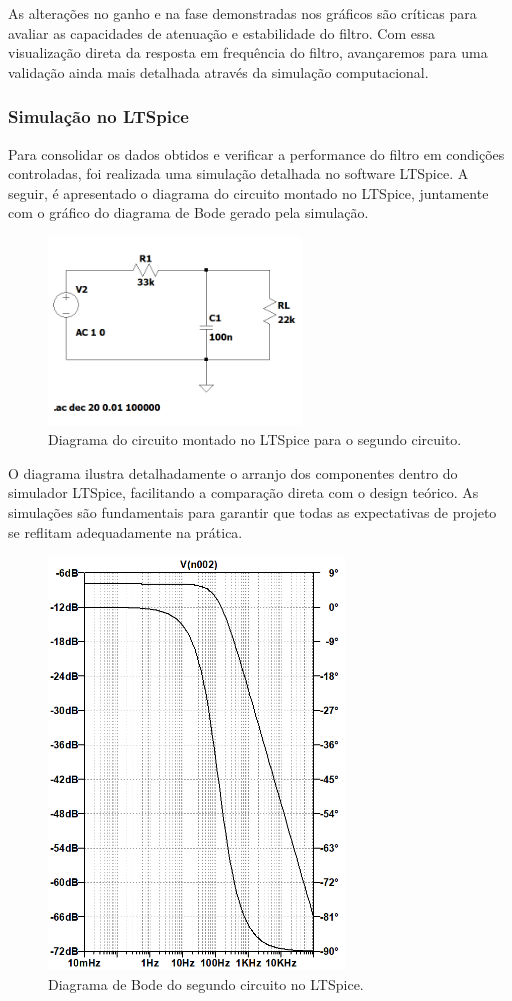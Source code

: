 \documentclass[
	12pt,				%
	openright,			%
	twoside,			%
	a4paper,			%
	english,			%
	french,				%
	spanish,			%
	brazil,				%
	]{abntex2}
\begin{document}
As alterações no ganho e na fase demonstradas nos gráficos são críticas para avaliar as capacidades de atenuação e estabilidade do filtro. Com essa visualização direta da resposta em frequência do filtro, avançaremos para uma validação ainda mais detalhada através da simulação computacional.
\pagebreak

\subsubsection{Simulação no LTSpice}
Para consolidar os dados obtidos e verificar a performance do filtro em condições controladas, foi realizada uma simulação detalhada no software LTSpice. A seguir, é apresentado o diagrama do circuito montado no LTSpice, juntamente com o gráfico do diagrama de Bode gerado pela simulação.

\begin{figure}[H]
    \centering
    \includegraphics[width=0.6\textwidth]{imgs/second_circuit_ltspice_diagram.png}
    \caption{Diagrama do circuito montado no LTSpice para o segundo circuito.}
    \label{fig:second_circuit_ltspice_diagram}
\end{figure}

O diagrama ilustra detalhadamente o arranjo dos componentes dentro do simulador LTSpice, facilitando a comparação direta com o design teórico. As simulações são fundamentais para garantir que todas as expectativas de projeto se reflitam adequadamente na prática.

\begin{figure}[H]
    \centering    \includegraphics[width=0.7\textwidth,height=0.4\textwidth]{imgs/second_circuit_ltspice_bode.png}
    \caption{Diagrama de Bode do segundo circuito no LTSpice.}
    \label{fig:second_circuit_ltspice_bode}
\end{figure}
\end{document}
